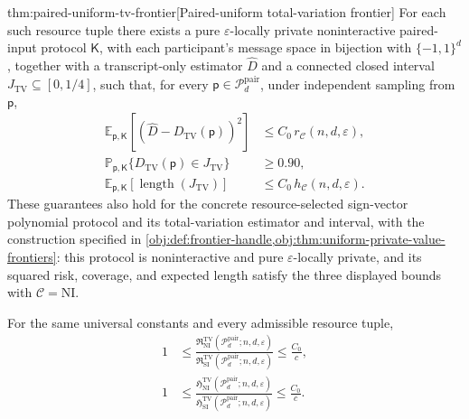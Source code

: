 \begin{theoremv}{thm:paired-uniform-tv-frontier}[Paired-uniform total-variation frontier]
For each such resource tuple there exists a pure \(\varepsilon\)-locally private noninteractive paired-input protocol \(\mathsf K\), with each participant's message space in bijection with \(\{-1,1\}^d\), together with a transcript-only estimator \(\widehat D\) and a connected closed interval \(J_{\mathrm{TV}}\subseteq[0,1/4]\), such that, for every \(\mathsf p\in\mathcal P_d^{\mathrm{pair}}\), under independent sampling from \(\mathsf p\),
\[
\begin{aligned}
 \mathbb E_{\mathsf p,\mathsf K}
   [(\widehat D-D_{\mathrm{TV}}(\mathsf p))^2]
 &\le C_0\,r_{\mathcal C}(n,d,\varepsilon),\\
 \mathbb P_{\mathsf p,\mathsf K}
   \{D_{\mathrm{TV}}(\mathsf p)\in J_{\mathrm{TV}}\}
 &\ge0.90,\\
 \mathbb E_{\mathsf p,\mathsf K}
   [\operatorname{length}(J_{\mathrm{TV}})]
 &\le C_0\,h_{\mathcal C}(n,d,\varepsilon).
\end{aligned}
\]
These guarantees also hold for the concrete resource-selected sign-vector polynomial protocol and its total-variation estimator and interval, with the construction specified in \cref{obj:def:frontier-handle,obj:thm:uniform-private-value-frontiers}: this protocol is noninteractive and pure \(\varepsilon\)-locally private, and its squared risk, coverage, and expected length satisfy the three displayed bounds with \(\mathcal C=\mathrm{NI}\).

For the same universal constants and every admissible resource tuple,
\[
\begin{aligned}
1
&\le
\frac{\mathfrak R^{\mathrm{TV}}_{\mathrm{NI}}
  (\mathcal P_d^{\mathrm{pair}};n,d,\varepsilon)}
 {\mathfrak R^{\mathrm{TV}}_{\mathrm{SI}}
  (\mathcal P_d^{\mathrm{pair}};n,d,\varepsilon)}
\le \frac{C_0}{c},\\
1
&\le
\frac{\mathfrak H^{\mathrm{TV}}_{\mathrm{NI}}
  (\mathcal P_d^{\mathrm{pair}};n,d,\varepsilon)}
 {\mathfrak H^{\mathrm{TV}}_{\mathrm{SI}}
  (\mathcal P_d^{\mathrm{pair}};n,d,\varepsilon)}
\le \frac{C_0}{c}.
\end{aligned}
\]


\end{theoremv}
